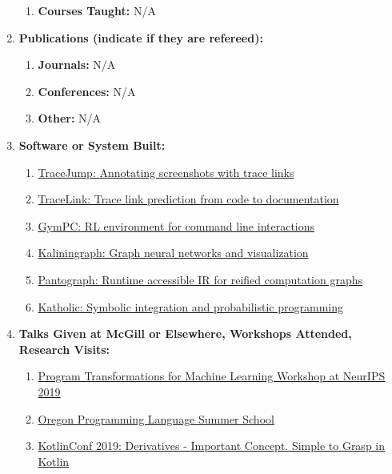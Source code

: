 \documentclass[11pt]{article}
\begin{document}
\begin{enumerate}
\begin{enumerate}
            \item \textbf{Courses Taught:} N/A

        \end{enumerate}

        \item \textbf{Publications (indicate if they are refereed):}
        \begin{enumerate}
            \item \textbf{Journals:} N/A

            \item \textbf{Conferences:} N/A

            \item \textbf{Other:} N/A

        \end{enumerate}

        \item \textbf{Software or System Built:}

        \begin{enumerate}
            \item \href{https://github.com/acejump/tracejump}{TraceJump: Annotating screenshots with trace links}
            \item \href{https://github.com/breandan/tracelink}{TraceLink: Trace link prediction from code to documentation}
            \item \href{https://github.com/breandan/gym-pc}{GymPC: RL environment for command line interactions}
            \item \href{https://github.com/breandan/kaliningraph}{Kaliningraph: Graph neural networks and visualization}
            \item \href{https://github.com/breandan/pantograph}{Pantograph: Runtime accessible IR for reified computation graphs}
            \item \href{https://github.com/breandan/katholic}{Katholic: Symbolic integration and probabilistic programming}
        \end{enumerate}

        \item \textbf{Talks Given at McGill or Elsewhere, Workshops Attended, Research Visits:}

        \begin{enumerate}
            \item \href{https://program-transformations.github.io/}{Program Transformations for Machine Learning Workshop at NeurIPS 2019}
            \item \href{https://www.cs.uoregon.edu/research/summerschool/summer19/topics.php}{Oregon Programming Language Summer School}
            \item \href{https://kotlinconf.com/2019/talks/}{KotlinConf 2019: Derivatives - Important Concept. Simple to Grasp in Kotlin}
        \end{enumerate}


\end{enumerate}
\end{document}
